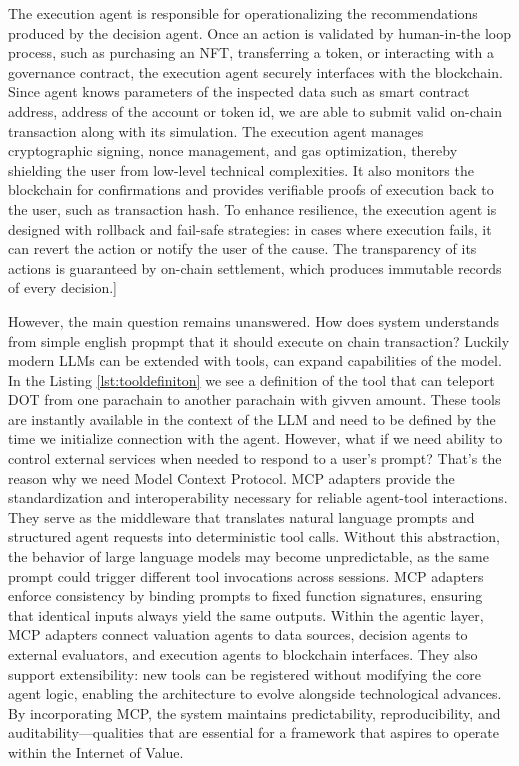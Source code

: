 The execution agent is responsible for operationalizing the recommendations produced by the decision agent. Once an action is validated by human-in-the loop process, such as purchasing an NFT, transferring a token, or interacting with a governance contract, the execution agent securely interfaces with the blockchain. Since agent knows parameters of the inspected data such as smart contract address, address of the account or token id, we are able to submit valid on-chain transaction along with its simulation. The execution agent manages cryptographic signing, nonce management, and gas optimization, thereby shielding the user from low-level technical complexities. It also monitors the blockchain for confirmations and provides verifiable proofs of execution back to the user, such as transaction hash. To enhance resilience, the execution agent is designed with rollback and fail-safe strategies: in cases where execution fails, it can revert the action or notify the user of the cause. The transparency of its actions is guaranteed by on-chain settlement, which produces immutable records of every decision.]



However, the main question remains unanswered. How does system understands from simple english propmpt that it should execute on chain transaction? Luckily modern LLMs can be extended with tools, can expand capabilities of the model. In the Listing \ref{lst:tooldefiniton} we see a definition of the tool that can teleport DOT from one parachain to another parachain with givven amount. These tools are instantly available in the context of the LLM and need to be defined by the time we initialize connection with the agent.
However, what if we need ability to control external services when needed to respond to a user's prompt? That's the reason why we need  Model Context Protocol.
MCP adapters provide the standardization and interoperability necessary for reliable agent-tool interactions. They serve as the middleware that translates natural language prompts and structured agent requests into deterministic tool calls. Without this abstraction, the behavior of large language models may become unpredictable, as the same prompt could trigger different tool invocations across sessions. MCP adapters enforce consistency by binding prompts to fixed function signatures, ensuring that identical inputs always yield the same outputs. Within the agentic layer, MCP adapters connect valuation agents to data sources, decision agents to external evaluators, and execution agents to blockchain interfaces. They also support extensibility: new tools can be registered without modifying the core agent logic, enabling the architecture to evolve alongside technological advances. By incorporating MCP, the system maintains predictability, reproducibility, and auditability—qualities that are essential for a framework that aspires to operate within the Internet of Value.



